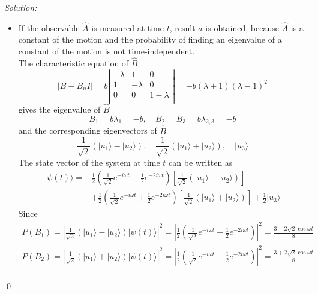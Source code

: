 \documentclass[12pt,a4paper]{article}
\newenvironment{sol}
    {\emph{Solution:}
    }
    {
    \qed
    }
\begin{document}
\begin{sol}
\begin{itemize}
\begin{align}
\begin{array}{ccc}
\frac{1}{\sqrt{2}}e^{-i\omega t}&\frac{1}{2}e^{-2i\omega t}&\frac{1}{2}e^{-2i\omega t}
\end{array}\right)\\
=&b\left(\frac{1}{2\sqrt{2}}e^{-i\omega t}+\frac{1}{2\sqrt{2}}e^{i\omega t}+\frac{1}{4}\right)=\left(\frac{1}{\sqrt{2}}\cos\omega t+\frac{1}{4}\right)b
\end{align}
Comment: $\hat{A}$ is a constant of motion while $\hat{B}$ not.
\item[(e)] If the observable $\hat{A}$ is measured at time $t$, result $a$ is obtained, because $\hat{A}$ is a constant of the motion and the probability of finding an eigenvalue of a constant of the motion is not time-independent.\\
The characteristic equation of $\hat{B}$
\begin{equation}
|B-B_nI|=b\left|\begin{array}{ccc}
-\lambda&1&0\\
1&-\lambda&0\\
0&0&1-\lambda\\
\end{array}\right|=-b(\lambda+1)(\lambda-1)^2
\end{equation}
gives the eigenvalue of $\hat{B}$
\begin{equation}
B_1=b\lambda_1=-b,\quad B_2=B_3=b\lambda_{2,3}=-b
\end{equation}
and the corresponding eigenvectors of $\hat{B}$
\begin{equation}
\frac{1}{\sqrt{2}}(|u_1\rangle-|u_2\rangle),\quad\frac{1}{\sqrt{2}}(|u_1\rangle+|u_2\rangle),\quad|u_3\rangle
\end{equation}
The state vector of the system at time $t$ can be written as
\begin{align}
\nonumber|\psi(t)\rangle=&\frac{1}{2}\left(\frac{1}{\sqrt{2}}e^{-i\omega t}-\frac{1}{2}e^{-2i\omega t}\right)\left[\frac{1}{\sqrt{2}}(|u_1\rangle-|u_2\rangle)\right]\\
&+\frac{1}{2}\left(\frac{1}{\sqrt{2}}e^{-i\omega t}+\frac{1}{2}e^{-2i\omega t}\right)\left[\frac{1}{\sqrt{2}}(|u_1\rangle+|u_2\rangle)\right]+\frac{1}{2}|u_3\rangle
\end{align}
Since
\begin{gather}
P(B_1)=\left|\frac{1}{\sqrt{2}}(|u_1\rangle-|u_2\rangle)|\psi(t)\rangle\right|^2=\left|\frac{1}{2}\left(\frac{1}{\sqrt{2}}e^{-i\omega t}-\frac{1}{2}e^{-2i\omega t}\right)\right|^2=\frac{3-2\sqrt{2}\cos\omega t}{8}\\
P(B_2)=\left|\frac{1}{\sqrt{2}}(|u_1\rangle+|u_2\rangle)|\psi(t)\rangle\right|^2=\left|\frac{1}{2}\left(\frac{1}{\sqrt{2}}e^{-i\omega t}+\frac{1}{2}e^{-2i\omega t}\right)\right|^2=\frac{3+2\sqrt{2}\cos\omega t}{8}\\

\end{gather}
\end{itemize}
\end{sol}
\end{document}
